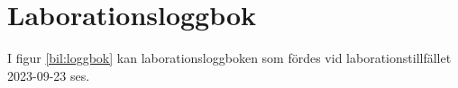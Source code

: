 \section{Laborationsloggbok}

I figur \ref{bil:loggbok} kan laborationsloggboken som fördes vid laborationstillfället 2023-09-23 ses.

\begin{figure}[H] 
    \centering
    \begin{subfigure}{.5\textwidth}
      \centering
    \end{subfigure}%
    \begin{subfigure}{.5\textwidth}
      \centering

\end{subfigure}
\end{figure}
